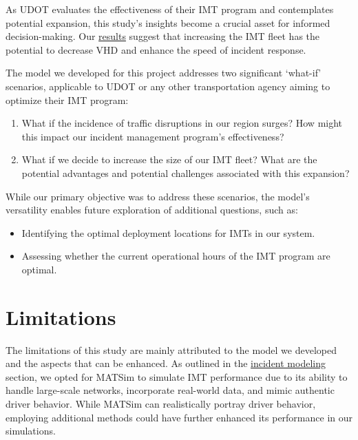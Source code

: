 \documentclass[fancy, oneside, mastersfancy, ms]{byuthesis}
\providecommand{\tightlist}{%
  \setlength{\itemsep}{0pt}\setlength{\parskip}{0pt}}\usepackage{longtable,booktabs,array}
\begin{document}
As UDOT evaluates the effectiveness of their IMT program and
contemplates potential expansion, this study's insights become a crucial
asset for informed decision-making. Our
\protect\hyperlink{sec-results}{results} suggest that increasing the IMT
fleet has the potential to decrease VHD and enhance the speed of
incident response.

The model we developed for this project addresses two significant
`what-if' scenarios, applicable to UDOT or any other transportation
agency aiming to optimize their IMT program:

\begin{enumerate}
\def\labelenumi{\arabic{enumi}.}
\tightlist
\item
  What if the incidence of traffic disruptions in our region surges? How
  might this impact our incident management program's effectiveness?
\item
  What if we decide to increase the size of our IMT fleet? What are the
  potential advantages and potential challenges associated with this
  expansion?
\end{enumerate}

While our primary objective was to address these scenarios, the model's
versatility enables future exploration of additional questions, such as:

\begin{itemize}
\tightlist
\item
  Identifying the optimal deployment locations for IMTs in our system.
\item
  Assessing whether the current operational hours of the IMT program are
  optimal.
\end{itemize}

\hypertarget{sec-limitations}{%
\section{Limitations}\label{sec-limitations}}

The limitations of this study are mainly attributed to the model we
developed and the aspects that can be enhanced. As outlined in the
\protect\hyperlink{sec-inc_modeling}{incident modeling} section, we
opted for MATSim to simulate IMT performance due to its ability to
handle large-scale networks, incorporate real-world data, and mimic
authentic driver behavior. While MATSim can realistically portray driver
behavior, employing additional methods could have further enhanced its
performance in our simulations.
\end{document}
